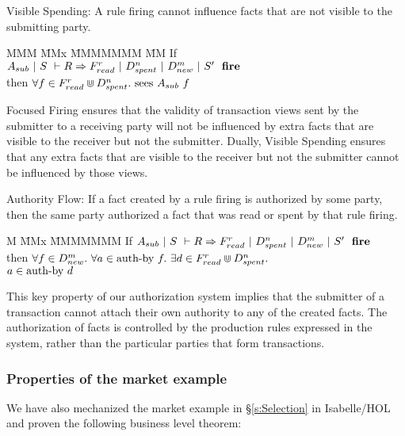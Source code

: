 \begin{theorem}
Visible Spending: A rule firing cannot influence facts that are not visible to the submitting party.
\end{theorem}
\begin{tabbing}
MMM \= MMx \= MMMMMMM \= MM \kill
\> If     \> $A_{sub}~|~S~\vdash R \Rightarrow F_{read}^r~|~D_{spent}^n~|~D_{new}^m~|~S'~~\textbf{fire}$ \\
\> then   \> $\forall f \in F_{read}^r \Cup D_{spent}^n.\ \textrm{sees}~ A_{sub}~ f$
\end{tabbing}

Focused Firing ensures that the validity of transaction views sent by the submitter to a receiving party will not be influenced by extra facts that are visible to the receiver but not the submitter. Dually, Visible Spending ensures that any extra facts that are visible to the receiver but not the submitter cannot be influenced by those views.


\begin{theorem}
Authority Flow: If a fact created by a rule firing is authorized by some party, then the same party authorized a fact that was read or spent by that rule firing.
\end{theorem}
\begin{tabbing}
M \= MMx \= MMMMMMM \kill
\> If   \> $A_{sub}~|~S~\vdash R \Rightarrow F_{read}^r~|~D_{spent}^n~|~D_{new}^m~|~S'~~\textbf{fire}$ \\
\> then \> $\forall f \in D_{new}^m.\
            \forall a \in \textrm{auth-by}~f.\
            \exists d \in F_{read}^r \Cup D_{spent}^n.$ \\
\>      \> \hspace{1em}$a \in \textrm{auth-by}~d$
\end{tabbing}

This key property of our authorization system implies that the submitter of a transaction cannot attach their own authority to any of the created facts. The authorization of facts is controlled by the production rules expressed in the system, rather than the particular parties that form transactions.


\eject{}
\subsubsection{Properties of the market example}
We have also mechanized the market example in \S\ref{s:Selection} in Isabelle/HOL and proven the following business level theorem:

